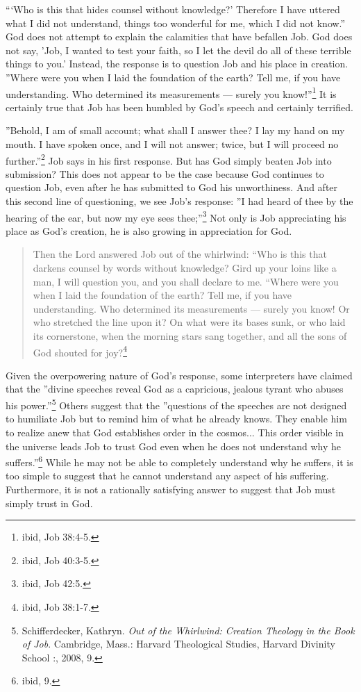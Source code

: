 ```Who is this that hides counsel without knowledge?' Therefore I have uttered what I did not understand, things too wonderful for me, which I did not know.'' God does not attempt to explain the calamities that have befallen Job. God does not say, 'Job, I wanted to test your faith, so I let the devil do all of these terrible things to you.' Instead, the response is to question Job and his place in creation. ''Where were you when I laid the foundation of the earth? Tell me, if you have understanding. Who determined its measurements --- surely you know!''\footnote{ibid, Job 38:4-5.} It is certainly true that Job has been humbled by God's speech and certainly terrified. 

''Behold, I am of small account; what shall I answer thee? I lay my hand on my mouth. I have spoken once, and I will not answer; twice, but I will proceed no further.''\footnote{ibid, Job 40:3-5.} Job says in his first response. But has God simply beaten Job into submission? This does not appear to be the case because God continues to question Job, even after he has submitted to God his unworthiness. And after this second line of questioning, we see Job's response: ''I had heard of thee by the hearing of the ear, but now my eye sees thee;''\footnote{ibid, Job 42:5.} Not only is Job appreciating his place as God's creation, he is also growing in appreciation for God.

\begin{quote}
Then the Lord answered Job out of the whirlwind: ``Who is this that darkens counsel by words without knowledge? Gird up your loins like a man, I will question you, and you shall declare to me. ``Where were you when I laid the foundation of the earth? Tell me, if you have understanding. Who determined its measurements --- surely you know! Or who stretched the line upon it? On what were its bases sunk, or who laid its cornerstone, when the morning stars sang together, and all the sons of God shouted for joy?\footnote{ibid, Job 38:1-7.}
\end{quote}

Given the overpowering nature of God's response, some interpreters have claimed that the ''divine speeches reveal God as a capricious, jealous tyrant who abuses his power.''\footnote{Schifferdecker, Kathryn. \emph{Out of the Whirlwind: Creation Theology in the Book of Job}. Cambridge, Mass.: Harvard Theological Studies, Harvard Divinity School :, 2008, 9.} Others suggest that the ''questions of the speeches are not designed to humiliate Job but to remind him of what he already knows. They enable him to realize anew that God establishes order in the cosmos... This order visible in the universe leads Job to trust God even when he does not understand why he suffers.''\footnote{ibid, 9.} While he may not be able to completely understand why he suffers, it is too simple to suggest that he cannot understand any aspect of his suffering. Furthermore, it is not a rationally satisfying answer to suggest that Job must simply trust in God.

